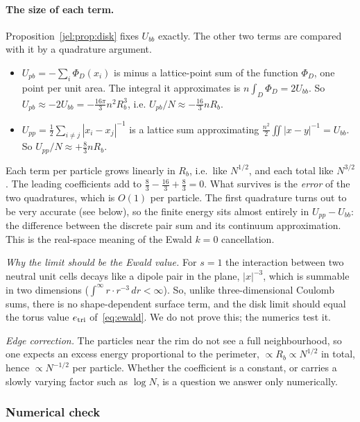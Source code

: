 \paragraph{The size of each term.} \tierC{} Proposition~\ref{jel:prop:disk} fixes $U_{bb}$ exactly. The other two terms
are compared with it by a quadrature argument.
\begin{itemize}[leftmargin=*]
\item $U_{pb}=-\sum_i\Phi_D(x_i)$ is minus a lattice-point sum of the function $\Phi_D$, one point per unit area. The
  integral it approximates is $n\int_D\Phi_D=2U_{bb}$. So $U_{pb}\approx-2U_{bb}=-\frac{16\pi}3n^2R_b^3$, i.e.
  $U_{pb}/N\approx-\frac{16}3nR_b$.
\item $U_{pp}=\frac12\sum_{i\ne j}|x_i-x_j|^{-1}$ is a lattice sum approximating
  $\frac{n^2}2\iint|x-y|^{-1}=U_{bb}$. So $U_{pp}/N\approx+\frac83nR_b$.
\end{itemize}
Each term per particle grows linearly in $R_b$, i.e.\ like $N^{1/2}$, and each total like $N^{3/2}$. The leading
coefficients add to $\frac83-\frac{16}3+\frac83=0$. What survives is the \emph{error} of the two quadratures, which is
$O(1)$ per particle. The first quadrature turns out to be very accurate (see below), so the finite energy sits almost
entirely in $U_{pp}-U_{bb}$: the difference between the discrete pair sum and its continuum approximation. This is the
real-space meaning of the Ewald $k=0$ cancellation.

\emph{Why the limit should be the Ewald value.} \tierC{} For $s=1$ the interaction between two neutral unit cells
decays like a dipole pair in the plane, $|x|^{-3}$, which is summable in two dimensions
($\int^\infty r\cdot r^{-3}\,dr<\infty$). So, unlike three-dimensional Coulomb sums, there is no shape-dependent
surface term, and the disk limit should equal the torus value $e_{\rm tri}$ of~\eqref{eq:ewald}. We do not prove this;
the numerics test it.

\emph{Edge correction.} \tierC{} The particles near the rim do not see a full neighbourhood, so one expects an excess
energy proportional to the perimeter, $\propto R_b\propto N^{1/2}$ in total, hence $\propto N^{-1/2}$ per particle.
Whether the coefficient is a constant, or carries a slowly varying factor such as $\log N$, is a question we answer
only numerically.

\subsubsection{Numerical check}\label{jel:num}

